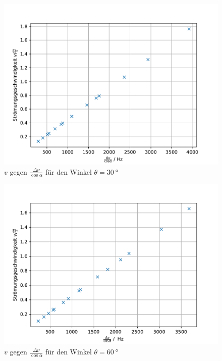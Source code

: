 %
\begin{figure}[h!]
  \centering
  \includegraphics[width=\textwidth]{30geschw.pdf}
  \caption{$v$ gegen $\frac{\Delta \nu}{\cos{\alpha}}$ für den Winkel $\theta=\SI{30}{°}$}
  \label{fig:30}
\end{figure}
%
\begin{figure}[h!]
  \centering
  \includegraphics[width=\textwidth]{60geschw.pdf}
  \caption{$v$ gegen $\frac{\Delta \nu}{\cos{\alpha}}$ für den Winkel $\theta=\SI{60}{°}$}
  \label{fig:60}
\end{figure}

\FloatBarrier

